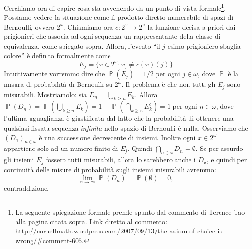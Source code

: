 \documentclass[12pt,a4paper]{report}
\theoremstyle{definition}
\theoremstyle{num.custom-title}
\DeclareMathOperator{\PPP}{\mathbb{P}}
\begin{document}
Cerchiamo ora di capire cosa sta avvenendo da un punto di vista formale\footnote{La seguente spiegazione formale prende spunto dal commento di Terence Tao alla pagina citata sopra. Link diretto al commento: \url{http://cornellmath.wordpress.com/2007/09/13/the-axiom-of-choice-is-wrong/\#comment-606}.}. Possiamo vedere la situazione come il prodotto diretto numerabile di spazi di Bernoulli, ovvero $2^\omega$. Chiamiamo ora $c: 2^\omega \to 2^\omega$ la funzione decisa a priori dai prigionieri che associa ad ogni sequenza un rappresentante della classe di equivalenza, come spiegato sopra. Allora, l'evento ``il $j$-esimo prigioniero sbaglia colore'' è definito formalmente come 
\[
E_j=\{x \in 2^\omega : x_j \neq c(x)(j)\}
\]
Intuitivamente vorremmo dire che $\PPP(E_j)=1/2$ per ogni $j \in \omega$, dove $\PPP$ è la misura di probabilità di Bernoulli su $2^\omega$. Il problema è che non tutti gli $E_j$ sono misurabili. Mostriamolo: sia $D_n=\bigcup_{k \geq n} E_k$. Allora $\PPP(D_n)=\PPP(\bigcup_{k \geq n} E_k)=1-\PPP(\bigcap_{k \geq n} E_k^c)=1$ per ogni $n \in \omega$, dove l'ultima uguaglianza è giustificata dal fatto che la probabilità di ottenere una qualsiasi fissata sequenza \emph{infinita} nello spazio di Bernoulli è nulla. Osserviamo che $(D_n)_{n \in \omega}$ è una successione decrescente di insiemi. Inoltre ogni $x \in 2^\omega$ appartiene solo ad un numero finito di $E_j$. Quindi $\bigcap_{n \in \omega} D_n = \emptyset$. Se per assurdo gli insiemi $E_j$ fossero tutti misurabili, allora lo sarebbero anche i $D_n$, e quindi per continuità delle misure di probabilità sugli insiemi misurabili avremmo:
\[
\lim_{n \to \infty} \PPP(D_n) = \PPP(\emptyset)=0,
\]
contraddizione.






\cleardoublepage
{}
\end{document}
